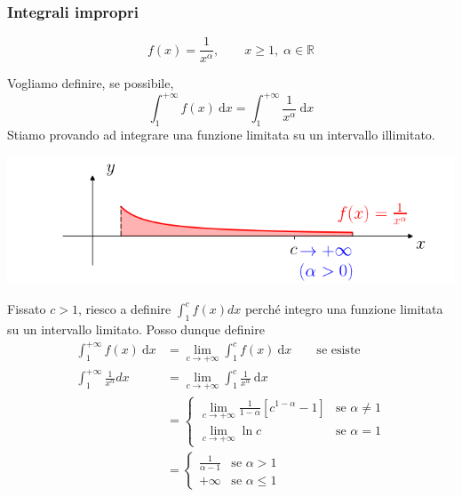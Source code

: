\subsubsection{Integrali impropri}
\begin{exbar}
\begin{example}
	\begin{equation*}
		f(x)=\frac{1}{x^\alpha}, \qquad x \geq 1, \; \alpha \in \mathbb{R}
	\end{equation*}
	
	Vogliamo definire, se possibile, 
	\begin{equation*}
		\int_{1}^{+\infty} f(x) \ \mathrm{d}x= \int_{1}^{+\infty}\frac{1}{x^\alpha} \ \mathrm{d}x
	\end{equation*}
	Stiamo provando ad integrare una funzione limitata su un intervallo illimitato.
	\begin{center}
		\includegraphics[width=\linewidth]{integrali_impropri/pag77}
		\label{fig:pag77}
	\end{center}

	Fissato $c > 1$, riesco a definire $\int_{1}^{c} f(x)dx$ perché integro una funzione limitata su un intervallo limitato. Posso dunque definire
	\begin{align*}
		\int_{1}^{+\infty} f(x) \ \mathrm{d}x 
		&= \lim_{c\rightarrow +\infty} \int_{1}^{c}f(x) \ \mathrm{d}x \qquad \text{se esiste}
		\\
		\int_{1}^{+\infty} \frac{1}{x^\alpha} dx 
		&= \lim_{c \rightarrow + \infty} \int_{1}^{c} \frac{1}{x^\alpha} \ \mathrm{d} x 
		\\
		&=
		\begin{cases}
			\lim_{c \rightarrow +\infty}\frac{1}{1-\alpha}[c^{1-\alpha}-1] & \text{se } \alpha \neq 1
			\\[1em]
			\lim_{c \rightarrow +\infty} \ln c & \text{se } \alpha=1
		\end{cases}
		\\
		&=
		\begin{cases}
			 \frac{1}{\alpha-1} & \text{se } \alpha > 1
			\\[1em]
			+\infty & \text{se } \alpha \leq 1
		\end{cases}
	\end{align*}
\end{example}
\end{exbar}

